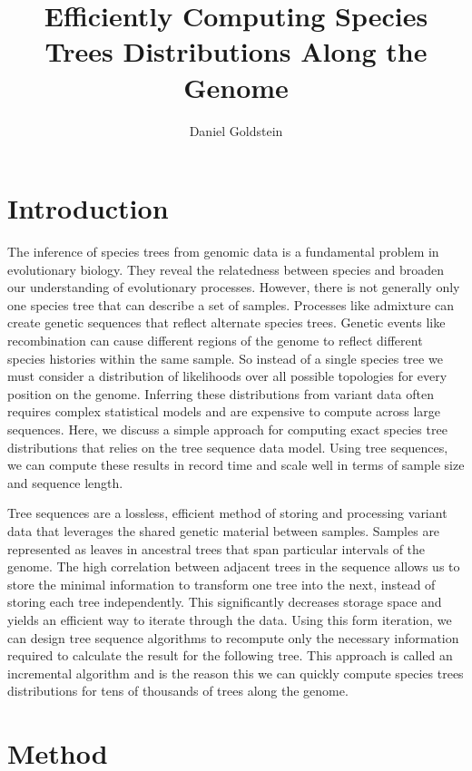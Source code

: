 \documentclass{article}
\begin{document}
\title{Efficiently Computing Species Trees Distributions Along the Genome}
\author{Daniel Goldstein}
\maketitle


\section{Introduction}

The inference of species trees from genomic data is a fundamental problem in
evolutionary biology. They reveal the relatedness between species and broaden 
our understanding of evolutionary processes. However, there is not generally
only one species tree that can describe a set of samples.
Processes like admixture can create genetic sequences that reflect
alternate species trees.
Genetic events like recombination can cause different regions of the genome
to reflect different species histories within the same sample.
So instead of a single species tree we must consider a distribution
of likelihoods over all possible topologies for every position on the genome.
Inferring these distributions from variant data often requires complex
statistical models and are expensive to compute across large sequences.
Here, we discuss a simple approach for computing exact
species tree distributions that relies on the tree sequence data model.
Using tree sequences, we can compute these results in record time and
scale well in terms of sample size and sequence length.

Tree sequences are a lossless, efficient method of storing and processing
variant data that leverages the shared genetic material between samples.
Samples are represented as leaves in ancestral trees that span
particular intervals of the genome. The high correlation between adjacent
trees in the sequence allows us to store the minimal information to transform
one tree into the next, instead of storing each tree independently. This
significantly decreases storage space and yields an efficient way to iterate
through the data. Using this form iteration, we can design tree sequence
algorithms to recompute only the necessary information required to calculate
the result for the following tree.
This approach is called an incremental algorithm and is the reason this
we can quickly compute species trees distributions for tens of thousands of
trees along the genome.

\section{Method}
\end{document}
